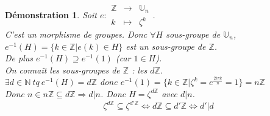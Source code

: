 \documentclass[a4paper, oneside]{report}
\theoremstyle{break}
\newtheorem*{demo}{Démonstration}
\newcommand{\N}{\mathbb{N}}
\newcommand{\Z}{\mathbb{Z}}
\newcommand{\U}{\mathbb{U}}
\begin{document}
\begin{demo}
	Soit $e : \begin{array}{lll}
	\Z &\rightarrow &\U_n\\
	k&\mapsto& \zeta^k
	\end{array}$.\\
	C'est un morphisme de groupes. Donc $\forall H$ sous-groupe de $\U_n$, $e^{-1}(H)=\{k\in \Z |e(k)\in H \}$ est un sous-groupe de $\Z$.\\
	De plus $e^{-1}(H)\supseteq e^{-1}(1)$ (car $1\in H$).\\
	On connaît les sous-groupes de $\Z$ : les $d\Z$.\\
	$\exists d\in \N~tq~ e^{-1}(H)=d\Z$ donc $e^{-1}(1)=\{k\in \Z | \zeta^k= e^{\frac{2i\pi k}{n}} =1 \}=n\Z$\\
	Donc $n\in n\Z \subseteq d\Z \Rightarrow d|n$. Donc $H=\zeta^{d\Z}$ avec $d|n$.
	$$\zeta^{d\Z}\subseteq \zeta^{d'\Z}\Leftrightarrow d\Z \subseteq d'\Z \Leftrightarrow d'|d$$
\end{demo}
\end{document}
